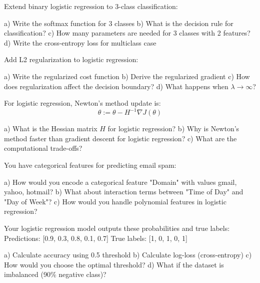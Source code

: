 \documentclass{article}
\newcounter{exercise}
\begin{document}
\begin{tcolorbox}[colback=gray!5!white,colframe=gray!75!black,title=Problem \stepcounter{exercise}: Multiclass Extension]

Extend binary logistic regression to 3-class classification:

a) Write the softmax function for 3 classes
b) What is the decision rule for classification?
c) How many parameters are needed for 3 classes with 2 features?
d) Write the cross-entropy loss for multiclass case
\end{tcolorbox}

\begin{tcolorbox}[colback=gray!5!white,colframe=gray!75!black,title=Problem \stepcounter{exercise}: Regularization]

Add L2 regularization to logistic regression:

a) Write the regularized cost function
b) Derive the regularized gradient
c) How does regularization affect the decision boundary?
d) What happens when $\lambda \to \infty$?
\end{tcolorbox}

\begin{tcolorbox}[colback=gray!5!white,colframe=gray!75!black,title=Problem \stepcounter{exercise}: Newton's Method]

For logistic regression, Newton's method update is:
$$\theta := \theta - H^{-1} \nabla J(\theta)$$

a) What is the Hessian matrix $H$ for logistic regression?
b) Why is Newton's method faster than gradient descent for logistic regression?
c) What are the computational trade-offs?
\end{tcolorbox}

\begin{tcolorbox}[colback=gray!5!white,colframe=gray!75!black,title=Problem \stepcounter{exercise}: Feature Engineering]

You have categorical features for predicting email spam:

a) How would you encode a categorical feature "Domain" with values {gmail, yahoo, hotmail}?
b) What about interaction terms between "Time of Day" and "Day of Week"?
c) How would you handle polynomial features in logistic regression?
\end{tcolorbox}

\begin{tcolorbox}[colback=gray!5!white,colframe=gray!75!black,title=Problem \stepcounter{exercise}: Model Evaluation]

Your logistic regression model outputs these probabilities and true labels:
Predictions: [0.9, 0.3, 0.8, 0.1, 0.7]
True labels: [1, 0, 1, 0, 1]

a) Calculate accuracy using 0.5 threshold
b) Calculate log-loss (cross-entropy)
c) How would you choose the optimal threshold?
d) What if the dataset is imbalanced (90\% negative class)?
\end{tcolorbox}
\end{document}
